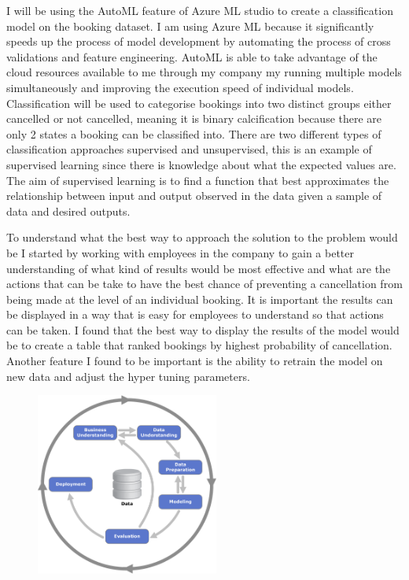 I will be using the AutoML feature of Azure ML studio to create a classification model on the booking dataset. I am using Azure ML because it significantly speeds up the process of model development by automating the process of cross validations and feature engineering. AutoML is able to take advantage of the cloud resources available to me through my company my running multiple models simultaneously and improving the execution speed of individual models.  Classification will be used to categorise bookings into two distinct groups either cancelled or not cancelled, meaning it is binary calcification because there are only 2 states a booking can be classified into. There are two different types of classification approaches supervised and unsupervised, this is an example of supervised learning since there is knowledge about what the expected values are. The aim of supervised learning is to find a function that best approximates the relationship between input and output observed in the data given a sample of data and desired outputs.

\vspace{5mm}

To understand what the best way to approach the solution to the problem would be I started by working with employees in the company to gain a better understanding of what kind of results would be most effective and what are the actions that can be take to have the best chance of preventing a cancellation from being made at the level of an individual booking. It is important the results can be displayed in a way that is easy for employees to understand so that actions can be taken. I found that the best way to display the results of the model would be to create a table that ranked bookings by highest probability of cancellation. Another feature I found to be important is the ability to retrain the model on new data and adjust the hyper tuning parameters.



 
 \begin{figure}[H]
 \includegraphics[width=6cm]{figures/CRISPDM_Process_Diagram.png}
 \caption{}
\end{figure}
 
